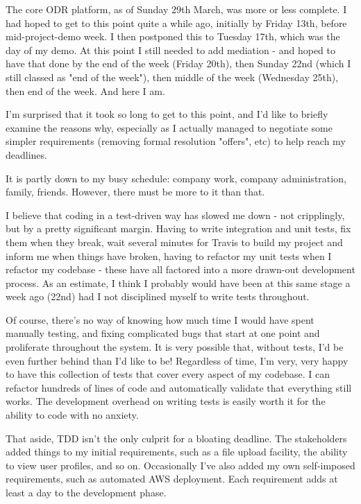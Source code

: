 The core ODR platform, as of Sunday 29th March, was more or less complete. I had hoped to get to this point quite a while ago, initially by Friday 13th, before mid-project-demo week. I then postponed this to Tuesday 17th, which was the day of my demo. At this point I still needed to add mediation - and hoped to have that done by the end of the week (Friday 20th), then Sunday 22nd (which I still classed as "end of the week"), then middle of the week (Wednesday 25th), then end of the week. And here I am.

I'm surprised that it took so long to get to this point, and I'd like to briefly examine the reasons why, especially as I actually managed to negotiate some simpler requirements (removing formal resolution "offers", etc) to help reach my deadlines.

It is partly down to my busy schedule: company work, company administration, family, friends. However, there must be more to it than that.

I believe that coding in a test-driven way has slowed me down - not cripplingly, but by a pretty significant margin. Having to write integration and unit tests, fix them when they break, wait several minutes for Travis to build my project and inform me when things have broken, having to refactor my unit tests when I refactor my codebase - these have all factored into a more drawn-out development process. As an estimate, I think I probably would have been at this same stage a week ago (22nd) had I not disciplined myself to write tests throughout.

Of course, there's no way of knowing how much time I would have spent manually testing, and fixing complicated bugs that start at one point and proliferate throughout the system. It is very possible that, without tests, I'd be even further behind than I'd like to be! Regardless of time, I'm very, very happy to have this collection of tests that cover every aspect of my codebase. I can refactor hundreds of lines of code and automatically validate that everything still works. The development overhead on writing tests is easily worth it for the ability to code with no anxiety.

That aside, TDD isn't the only culprit for a bloating deadline. The stakeholders added things to my initial requirements, such as a file upload facility, the ability to view user profiles, and so on. Occasionally I've also added my own self-imposed requirements, such as automated AWS deployment. Each requirement adds at least a day to the development phase.

